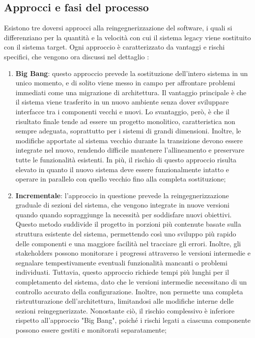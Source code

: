 \subsection{Approcci e fasi del processo}
Esistono tre doversi approcci alla reingegnerizzazione del software, i quali si differenziano per la quantità e la velocità con cui il sistema legacy viene sostituito con il sistema target. Ogni approccio è caratterizzato da vantaggi e rischi specifici, che vengono ora discussi nel dettaglio \cite{Majthoub2018,rosenberg1996software}:
\begin{enumerate}
  \item \textbf{Big Bang}: questo approccio prevede la sostituzione dell'intero sistema in un unico momento, e di solito viene messo in campo per affrontare problemi immediati come una migrazione di architettura. Il vantaggio principale è che il sistema viene trasferito in un nuovo ambiente senza dover sviluppare interfacce tra i componenti vecchi e nuovi. Lo svantaggio, però, è che il risultato finale tende ad essere un progetto monolitico, caratteristica non sempre adeguata, soprattutto per i sistemi di grandi dimensioni. Inoltre, le modifiche apportate al sistema vecchio durante la transizione devono essere integrate nel nuovo, rendendo difficile mantenere l'allineamento e preservare tutte le funzionalità esistenti. In più, il rischio di questo approccio risulta elevato in quanto il nuovo sistema deve essere funzionalmente intatto e operare in parallelo con quello vecchio fino alla completa sostituzione;

  \item \textbf{Incrementale}: l'approccio in questione prevede la reingegnerizzazione graduale di sezioni del sistema, che vengono integrate in nuove versioni quando quando sopraggiunge la necessità per soddisfare nuovi obiettivi. Questo metodo suddivide il progetto in porzioni più contenute basate sulla struttura esistente del sistema, permettendo così uno sviluppo più rapido delle componenti e una maggiore facilità nel tracciare gli errori. Inoltre, gli stakeholders possono monitorare i progressi attraverso le versioni intermedie e segnalare tempestivamente eventuali funzionalità mancanti o problemi individuati. Tuttavia, questo approccio richiede tempi più lunghi per il completamento del sistema, dato che le versioni intermedie necessitano di un controllo accurato della configurazione. Inoltre, non permette una completa ristrutturazione dell'architettura, limitandosi alle modifiche interne delle sezioni reingegnerizzate. Nonostante ciò, il rischio complessivo è inferiore rispetto all'approccio "Big Bang", poiché i rischi legati a ciascuna componente possono essere gestiti e monitorati separatamente;


\end{enumerate}
